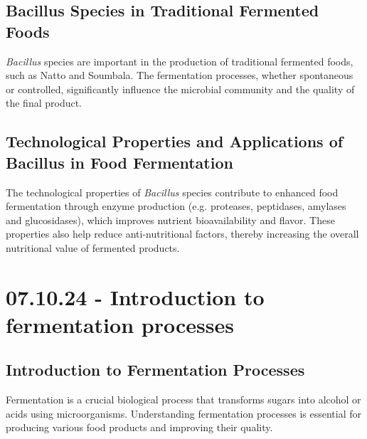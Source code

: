 \subsection{Bacillus Species in Traditional Fermented Foods}
\textit{Bacillus} species are important in the production of traditional fermented foods, such as Natto and Soumbala. The fermentation processes, whether spontaneous or controlled, significantly influence the microbial community and the quality of the final product.

\subsection{Technological Properties and Applications of Bacillus in Food Fermentation}
The technological properties of \textit{Bacillus} species contribute to enhanced food fermentation through enzyme production (e.g. proteases, peptidases, amylases and glucosidases), which improves nutrient bioavailability and flavor. These properties also help reduce anti-nutritional factors, thereby increasing the overall nutritional value of fermented products.

\section{07.10.24 - Introduction to fermentation processes}
\subsection{Introduction to Fermentation Processes}
Fermentation is a crucial biological process that transforms sugars into alcohol or acids using microorganisms. Understanding fermentation processes is essential for producing various food products and improving their quality.




